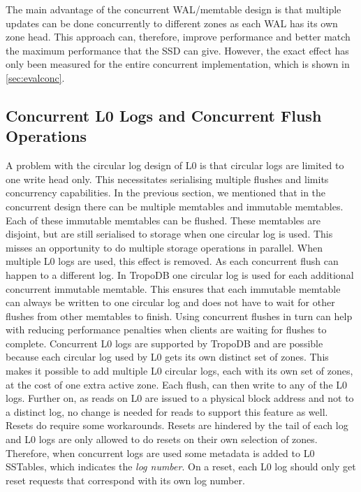 The main advantage of the concurrent WAL/memtable design is that multiple updates can be done concurrently to different zones as each WAL has its own zone head. This approach can, therefore, improve performance and better match the maximum performance that the SSD can give. However, the exact effect has only been measured for the entire concurrent implementation, which is shown in \autoref{sec:evalconc}.

\subsection{Concurrent L0 Logs and Concurrent Flush Operations}
A problem with the circular log design of L0 is that circular logs are limited to one write head only. This necessitates serialising multiple flushes and limits concurrency capabilities. In the previous section, we mentioned that in the concurrent design there can be multiple memtables and immutable memtables. Each of these immutable memtables can be flushed. These memtables are disjoint, but are still serialised to storage when one circular log is used. This misses an opportunity to do multiple storage operations in parallel. When multiple L0 logs are used, this effect is removed. As each concurrent flush can happen to a different log. In TropoDB one circular log is used for each additional concurrent immutable memtable. This ensures that each immutable memtable can always be written to one circular log and does not have to wait for other flushes from other memtables to finish. Using concurrent flushes in turn can help with reducing performance penalties when clients are waiting for flushes to complete. Concurrent L0 logs are supported by TropoDB and are possible because each circular log used by L0 gets its own distinct set of zones. This makes it possible to add multiple L0 circular logs, each with its own set of zones, at the cost of one extra active zone. Each flush, can then write to any of the L0 logs. Further on, as reads on L0 are issued to a physical block address and not to a distinct log, no change is needed for reads to support this feature as well. Resets do require some workarounds. Resets are hindered by the tail of each log and L0 logs are only allowed to do resets on their own selection of zones. Therefore, when concurrent logs are used some metadata is added to L0 SSTables, which indicates the \textit{log number}. On a reset, each L0 log should only get reset requests that correspond with its own log number. 
 
